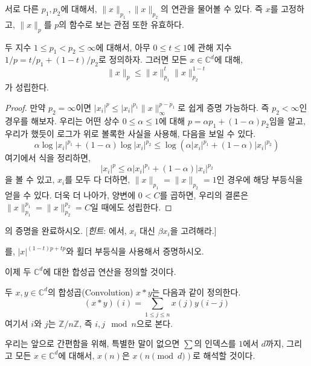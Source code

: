 서로 다른 $p_1, p_2$에 대해서, $\|x\|_{p_1}, \|x\|_{p_2}$의 연관을 물어볼 수 있다.
즉 $x$를 고정하고, $\|x\|_p$를 $p$의 함수로 보는 관점 또한 유효하다.
\begin{theorem}
\label{thm:pnormint1}
    두 지수 $1 \leq p_1 < p_2 \leq \infty$에 대해서, 아무 $0 \leq t \leq 1$에 관해 지수 $1/p = t/p_1 + (1 - t)/p_2$로 정의하자.
    그러면 모든 $x \in \mathbb{C}^d$에 대해,
    \begin{equation*}
        \|x\|_p \leq \|x\|^{t}_{p_1} \|x\|^{1 - t}_{p_2}
    \end{equation*}
    가 성립한다.
\end{theorem}
\begin{proof}
    만약 $p_2 = \infty$이면 $|x_i|^p \leq |x_i|^{p_1} \|x\|_\infty^{p - p_1}$로 쉽게 증명 가능하다.
    즉 $p_2 < \infty$인 경우를 해보자.
    우리는 어떤 상수 $0 \leq \alpha \leq 1$에 대해 $p = \alpha p_1 + (1 - \alpha) p_2$임을 알고, 우리가 했듯이 로그가 위로 볼록한 사실을 사용해, 다음을 보일 수 있다.
    \begin{equation*}
        \alpha \log |x_i|^{p_1} + (1 - \alpha) \log |x_i|^{p_2} \leq \log (\alpha |x_i|^{p_1} + (1 - \alpha)|x_i|^{p_2} )
    \end{equation*}
    여기에서 식을 정리하면,
    \begin{equation}
    \label{eq:pnormint1}
        |x_i|^p \leq \alpha |x_i|^{p_1} + (1 - \alpha) |x_i|^{p_2}
    \end{equation}
    을 볼 수 있고, $x_i$를 모두 다 더하면, $\|x\|_{p_1} = \|x\|_{p_2} = 1$인 경우에 해당 부등식을 얻을 수 있다.
    더욱 더 나아가, 양변에 $0 < C$를 곱하면, 우리의 결론은 $\|x\|^{p_1}_{p_1} = \|x\|^{p_2}_{p_2} = C$일 때에도 성립한다.
\end{proof}

\begin{exercise}
    의 증명을 완료하시오. [\textit{힌트}: 에서, $x_i$ 대신 $\beta x_i$을 고려해라.]
\end{exercise}

\begin{exercise}
    를, $|x|^{(1 - t)p + tp}$와 횔더 부등식을 사용해서 증명하시오.
\end{exercise}

이제 두 $\mathbb{C}^d$에 대한 합성곱 연산을 정의할 것이다.
\begin{definition}
\label{def:finconv}
    두 $x, y \in \mathbb{C}^d$의 합성곱(Convolution)  $x * y$는 다음과 같이 정의한다.
    \begin{equation*}
        (x * y)(i) = \sum_{1 \leq j \leq n} x(j)y(i - j)
    \end{equation*}
    여기서 $i$와 $j$는 $\mathbb{Z}/n\mathbb{Z}$, 즉 $i, j \mod{n}$으로 본다.
\end{definition}
\begin{remark}
    우리는 앞으로 간편함을 위해, 특별한 말이 없으면 $\sum$의 인덱스를 $1$에서 $d$까지, 그리고 모든 $x\in \mathbb{C}^d$에 대해서, $x(n)$은 $x(n \pmod{d})$로 해석할 것이다.
\end{remark}


